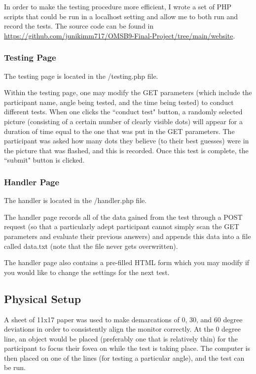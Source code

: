 \documentclass[12pt]{article}
\begin{document}
In order to make the testing procedure more efficient, I wrote a set of PHP
scripts that could be run in a localhost setting and allow me to both run and record the
tests. The source code can be found in
\url{https://github.com/junikimm717/OMSB9-Final-Project/tree/main/website}.

\subsubsection{Testing Page}
The testing page is located in the /testing.php file.

Within the testing page, one may modify the GET parameters (which include the
participant name, angle being tested, and the time being tested) to conduct
different tests. When one clicks the ``conduct test" button, a randomly selected
picture (consisting of a certain number of clearly visible dots) will appear
for a duration of time equal to the one that was put in the GET parameters. The
participant was asked how many dots they believe (to their best guesses) were
in the picture that was flashed, and this is recorded. Once this test is
complete, the ``submit" button is clicked.

\subsubsection{Handler Page}
The handler is located in the /handler.php file.

The handler page records all of the data gained from the test through a POST
request (so that a particularly adept participant cannot simply scan the GET
parameters and evaluate their previous answers) and appends this data
into a file called data.txt (note that the file never gets overwritten).

The handler page also contains a pre-filled HTML form which you may
modify if you would like to change the settings for the next test.

\subsection{Physical Setup}
A sheet of 11x17 paper was used to make demarcations of 0, 30, and 60 degree
deviations in order to consistently align the monitor correctly. At the 0
degree line, an object would be placed (preferably one that is relatively thin)
for the participant to focus their fovea on while the test is taking place.
The computer is then placed on one of the lines (for testing a particular
angle), and the test can be run.
\end{document}
